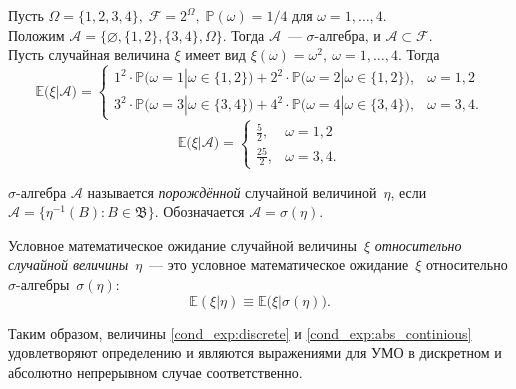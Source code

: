     \vspace{5mm}
    \begin{exmp}
        Пусть $\Omega = \{1, 2, 3, 4\}, \; \mathcal{F} = 2^{\Omega}, \; \mathbb{P}(\omega) = 1/4$ для $\omega = 1, \ldots, 4$. \\
        Положим $\mathcal{A} = \bigl\{ \varnothing, \{1, 2\}, \{3, 4\}, \Omega \bigr\}$. 
        Тогда $\mathcal{A}$~--- $\sigma$-алгебра, и $\mathcal{A} \subset \mathcal{F}$. \\
        Пусть случайная величина $\xi$ имеет вид $\xi(\omega) = \omega^2, \: \omega = 1, \ldots, 4$.
        Тогда 
        \begin{equation*}
            \mathbb{E}\bigl( \xi | \mathcal{A} \bigr) = \begin{cases}
                1^2 \cdot \mathbb{P}\bigl(\omega = 1 | \omega \in \{1, 2\}\bigr) + 2^2 \cdot \mathbb{P}\bigl(\omega = 2 | \omega \in \{1, 2\}\bigr), & \omega = 1, 2\\
                3^2 \cdot \mathbb{P}\bigl(\omega = 3 | \omega \in \{3, 4\}\bigr) + 4^2 \cdot \mathbb{P}\bigl(\omega = 4 | \omega \in \{3, 4\}\bigr), & \omega = 3, 4.
            \end{cases}
        \end{equation*}
        \begin{equation*}
            \mathbb{E}\bigl( \xi | \mathcal{A} \bigr) = \begin{cases}
                \frac{5}{2}, & \omega = 1, 2\\
                \frac{25}{2}, & \omega = 3, 4.
            \end{cases}
        \end{equation*}
        
    \end{exmp}

    \vspace{5mm}
    \begin{defn}
        $\sigma$-алгебра $\mathcal{A}$ называется \textit{порождённой} случайной величиной~$\eta$, если $\mathcal{A} = \bigl\{ \eta^{-1}(B)\colon B \in \mathfrak{B} \bigr\} $.
        Обозначается $\mathcal{A} = \sigma(\eta)$.
    \end{defn}

    \begin{defn}
        Условное математическое ожидание случайной величины~$\xi$ \textit{относительно случайной величины}~$\eta$~--- 
        это условное математическое ожидание~$\xi$ относительно $\sigma$-алгебры~$\sigma(\eta)$:
        $$ \mathbb{E} \left( \xi | \eta \right) \equiv \mathbb{E} \bigl( \xi | \sigma(\eta) \bigr).$$
    \end{defn}
    Таким образом, величины \ref{cond_exp:discrete} и \ref{cond_exp:abs_continious} удовлетворяют определению и являются выражениями для УМО в дискретном и абсолютно непрерывном случае соответственно.

